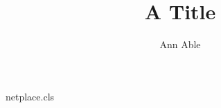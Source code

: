 \begin{filecontents*}[overwrite]{netplace.cls}
\def\@anames{}\def\@recd{Received 00 Month 20XX}
\renewcommand\author[1]{\gdef\@anames{#1}}
\newcommand\recd[1]{\gdef\@recd{\ignorespaces#1}}
\renewcommand\@author{\@anames\\\@recd}
\end{filecontents*}
\documentclass{netplace}

\title{A Title}
\author{Ann Able}
\maketitle
Text.

